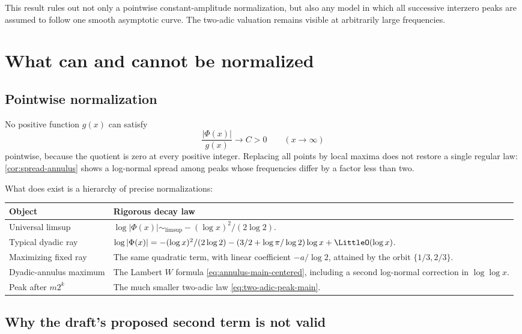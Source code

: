 \documentclass[11pt,oneside]{article}
\theoremstyle{definition}
\theoremstyle{remark}
\newcommand{\PhiF}{\Phi}
\begin{document}
This result rules out not only a pointwise constant-amplitude normalization,
but also any model in which all successive interzero peaks are assumed to
follow one smooth asymptotic curve.  The two-adic valuation remains visible
at arbitrarily large frequencies.

\section{What can and cannot be normalized}
\label{sec:normalization}

\subsection{Pointwise normalization}

No positive function \(g(x)\) can satisfy
\[
 \frac{|\PhiF(x)|}{g(x)}\longrightarrow C>0
 \qquad(x\to\infty)
\]
pointwise, because the quotient is zero at every positive integer.  Replacing
all points by local maxima does not restore a single regular law:
\cref{cor:spread-annulus} shows a log-normal spread among peaks whose
frequencies differ by a factor less than two.

What does exist is a hierarchy of precise normalizations:
\begin{center}
\begin{tabularx}{0.96\textwidth}{@{}>{\raggedright\arraybackslash}p{}X@{}}
\toprule
Object & Rigorous decay law \\
\midrule
Universal limsup &
\(\log|\PhiF(x)|\sim_{\limsup}-(\log x)^2/(2\log2)\).\\[0.4em]
Typical dyadic ray &
\(\log|\PhiF(x)|=-(\log x)^2/(2\log2)
 -(3/2+\log\pi/\log2)\log x+\LittleO(\log x)\).\\[0.4em]
Maximizing fixed ray &
The same quadratic term, with linear coefficient
\(-a/\log2\), attained by the orbit \(\{1/3,2/3\}\).\\[0.4em]
Dyadic-annulus maximum &
The Lambert \(W\) formula \eqref{eq:annulus-main-centered}, including a
second log-normal correction in \(\log\log x\).\\[0.4em]
Peak after \(m2^k\) &
The much smaller two-adic law \eqref{eq:two-adic-peak-main}.\\
\bottomrule
\end{tabularx}
\end{center}

\subsection{Why the draft's proposed second term is not valid}
\end{document}
